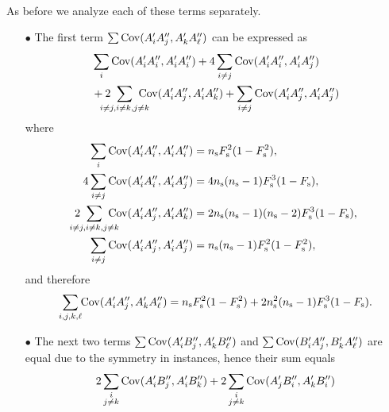 \begin{itemize}
\begin{align*}
    \end{align*}
    As before we analyze each of these terms separately.
    \begin{itemize}
      \item[$\bullet$]
        The first term $\sum {\mathrm{Cov}}(A'_i A''_j, A'_k A''_\ell)$ can be
        expressed as
        \begin{align*}
          &\sum_{i} \Cov(A'_i A''_i, A'_i A''_i)
            + 4 \sum_{i\ne j} \Cov(A'_i A''_i, A'_i A''_j) \\
          &+ 2\hspace{-4mm}\sum_{i \ne j, i \ne k, j \ne k}\hspace{-4mm} \Cov( A'_i A''_j, A'_i A''_k)
            + \sum_{i \ne j} \Cov( A'_i A''_j, A'_i A''_j)
        \end{align*}
        where
        \begin{align*}
          \sum_{i} \Cov(A'_i A''_i, A'_i A''_i) &= \g\FG^2(1 - \FG^2), \\
          4 \sum_{i\ne j} \Cov(A'_i A''_i, A'_i A''_j) &= 4\g(\g-1)\FG^3(1-\FG), \\
          2\hspace{-4mm}\sum_{i \ne j, i \ne k, j \ne k}\hspace{-4mm}
              \Cov( A'_i A''_j, A'_i A''_k) &= 2\g(\g-1)(\g-2) \FG^3( 1- \FG), \\
          \sum_{i \ne j} \Cov( A'_i A''_j, A'_i A''_j) &= \g(\g-1)\FG^2 ( 1 - \FG^2),
        \end{align*}
        and therefore
        \begin{equation}
          \label{eq:ag:comp_covariance_6}
          \sum_{i,j,k,\ell}\hspace{-1mm} {\mathrm{Cov}}(A'_i A''_j, A'_k A''_\ell)
            = n_\text{s} F_\text{s}^2( 1- F_\text{s}^2) + 2 n_\text{s}^2 (n_\text{s}-1) F_\text{s}^3 ( 1- F_\text{s}).
        \end{equation}
      \item[$\bullet$]
        The next two terms $\sum {\mathrm{Cov}}(A'_i B''_j, A'_k B''_\ell)$ and
        $\sum {\mathrm{Cov}}(B'_i A''_j, B'_k A''_\ell)$ are equal due to the
        symmetry in instances, hence their sum equals
        \begin{align*}
          &2 \sum_{\substack{i \\ j \ne k}} \Cov(A'_i B''_j, A'_i B''_k)
            + 2 \sum_{\substack{i \\ j \ne k}} \Cov(A'_j B''_i, A'_k B''_i) \\

\end{align*}
\end{itemize}
\end{itemize}
